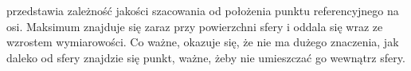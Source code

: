  przedstawia zależność jakości szacowania od położenia punktu referencyjnego na osi. Maksimum znajduje się zaraz przy powierzchni sfery i oddala się wraz ze wzrostem wymiarowości. Co ważne, okazuje się, że nie ma dużego znaczenia, jak daleko od sfery znajdzie się punkt, ważne, żeby nie umieszczać go wewnątrz sfery.


